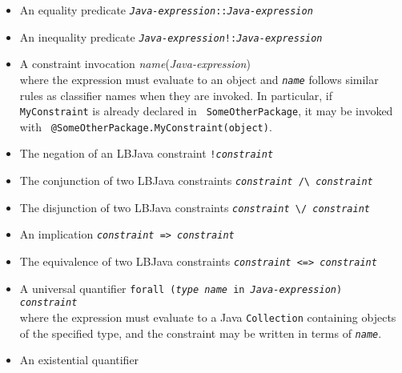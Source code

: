 \vspace{-.2cm}
\begin{itemize}
\item An equality predicate \hspace{.05cm}
      {\tt\emph{Java-expression}\hspace{.1cm}::\hspace{.1cm}\emph{Java-expression}}
\item An inequality predicate \hspace{.05cm}
      {\tt\emph{Java-expression}\hspace{.1cm}!:\hspace{.1cm}\emph{Java-expression}}
\item A constraint invocation \hspace{.05cm}
      {\tt@\emph{name}(\emph{Java-expression})} \\
      where the expression must evaluate to an object and {\tt\emph{name}}
      follows similar rules as classifier names when they are invoked.  In
      particular, if {\tt MyConstraint} is already declared in {\tt
      SomeOtherPackage}, it may be invoked with {\tt
      @SomeOtherPackage.MyConstraint(object)}.
\item The negation of an LBJava constraint \hspace{.05cm}
      {\tt !\emph{constraint}}
\item The conjunction of two LBJava constraints \hspace{.05cm}
      {\tt\emph{constraint} \verb|/\| \emph{constraint}}
\item The disjunction of two LBJava constraints \hspace{.05cm}
      {\tt\emph{constraint} \verb|\/| \emph{constraint}}
\item An implication \hspace{.05cm}
      {\tt\emph{constraint} => \emph{constraint}}
\item The equivalence of two LBJava constraints \hspace{.05cm}
      {\tt\emph{constraint} <=> \emph{constraint}}
\item A universal quantifier \hspace{.05cm}
      {\tt forall (\emph{type name} in \emph{Java-expression})
        \emph{constraint}} \\
      where the expression must evaluate to a Java {\tt Collection} containing
      objects of the specified type, and the constraint may be written in
      terms of {\tt\emph{name}}.
\item An existential quantifier \hspace{.05cm}

\end{itemize}
